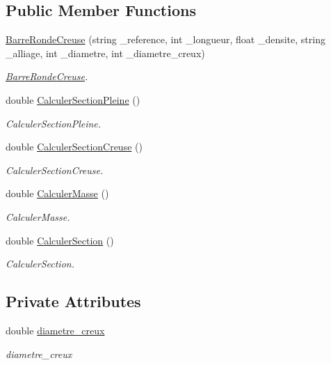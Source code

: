\subsection*{Public Member Functions}
\begin{DoxyCompactItemize}
\item 
\hyperlink{class_barre_ronde_creuse_ad0900f47420c5f5d722bc97af6b5ffd7}{Barre\+Ronde\+Creuse} (string \+\_\+reference, int \+\_\+longueur, float \+\_\+densite, string \+\_\+alliage, int \+\_\+diametre, int \+\_\+diametre\+\_\+creux)
\begin{DoxyCompactList}\small\item\em \hyperlink{class_barre_ronde_creuse}{Barre\+Ronde\+Creuse}. \end{DoxyCompactList}\item 
double \hyperlink{class_barre_ronde_creuse_a4e5242dcbb3599a116b2a46855f7bc67}{Calculer\+Section\+Pleine} ()
\begin{DoxyCompactList}\small\item\em Calculer\+Section\+Pleine. \end{DoxyCompactList}\item 
double \hyperlink{class_barre_ronde_creuse_af9402b2d372be8fef565f76d26050ba9}{Calculer\+Section\+Creuse} ()
\begin{DoxyCompactList}\small\item\em Calculer\+Section\+Creuse. \end{DoxyCompactList}\item 
double \hyperlink{class_barre_ronde_creuse_a328ae1b0b6a5fa0ddf4ca3c0fb531827}{Calculer\+Masse} ()
\begin{DoxyCompactList}\small\item\em Calculer\+Masse. \end{DoxyCompactList}\item 
double \hyperlink{class_barre_ronde_creuse_a46d24510057ea316c23c170d12afbd93}{Calculer\+Section} ()
\begin{DoxyCompactList}\small\item\em Calculer\+Section. \end{DoxyCompactList}\end{DoxyCompactItemize}
\subsection*{Private Attributes}
\begin{DoxyCompactItemize}
\item 
double \hyperlink{class_barre_ronde_creuse_a624997b1f29c756ce2add4db820f59c1}{diametre\+\_\+creux}
\begin{DoxyCompactList}\small\item\em diametre\+\_\+creux \end{DoxyCompactList}\end{DoxyCompactItemize}
